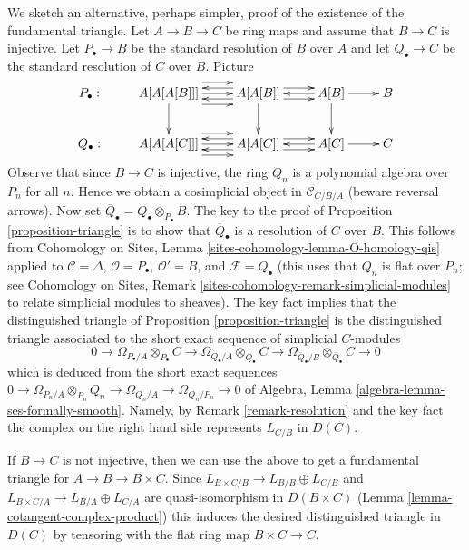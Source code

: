 \begin{remark}
\label{remark-triangle}
We sketch an alternative, perhaps simpler, proof of the existence of
the fundamental triangle.
Let $A \to B \to C$ be ring maps and assume that $B \to C$ is injective.
Let $P_\bullet \to B$ be the standard resolution of $B$ over $A$ and
let $Q_\bullet \to C$ be the standard resolution of $C$ over $B$.
Picture
$$
\xymatrix{
P_\bullet : &
A[A[A[B]]] \ar[d]
\ar@<2ex>[r]
\ar@<0ex>[r]
\ar@<-2ex>[r]
&
A[A[B]] \ar[d]
\ar@<1ex>[r]
\ar@<-1ex>[r]
\ar@<1ex>[l]
\ar@<-1ex>[l]
&
A[B] \ar[d] \ar@<0ex>[l] \ar[r] &
B \\
Q_\bullet : &
A[A[A[C]]]
\ar@<2ex>[r]
\ar@<0ex>[r]
\ar@<-2ex>[r]
&
A[A[C]]
\ar@<1ex>[r]
\ar@<-1ex>[r]
\ar@<1ex>[l]
\ar@<-1ex>[l]
&
A[C] \ar@<0ex>[l] \ar[r] &
C
}
$$
Observe that since $B \to C$ is injective, the ring $Q_n$ is a
polynomial algebra over $P_n$ for all $n$. Hence we obtain a cosimplicial
object in $\mathcal{C}_{C/B/A}$ (beware reversal arrows).
Now set $\overline{Q}_\bullet = Q_\bullet \otimes_{P_\bullet} B$.
The key to the proof of Proposition \ref{proposition-triangle}
is to show that $\overline{Q}_\bullet$ is a resolution of $C$ over $B$.
This follows from Cohomology on Sites, Lemma
\ref{sites-cohomology-lemma-O-homology-qis}
applied to $\mathcal{C} = \Delta$, $\mathcal{O} = P_\bullet$,
$\mathcal{O}' = B$, and $\mathcal{F} = Q_\bullet$ (this uses that $Q_n$
is flat over $P_n$; see Cohomology on Sites, Remark
\ref{sites-cohomology-remark-simplicial-modules} to relate simplicial modules
to sheaves). The key fact implies that the distinguished triangle of
Proposition \ref{proposition-triangle}
is the distinguished triangle associated to the short exact sequence
of simplicial $C$-modules
$$
0 \to
\Omega_{P_\bullet/A} \otimes_{P_\bullet} C \to
\Omega_{Q_\bullet/A} \otimes_{Q_\bullet} C \to
\Omega_{\overline{Q}_\bullet/B} \otimes_{\overline{Q}_\bullet} C \to 0
$$
which is deduced from the short exact sequences
$0 \to \Omega_{P_n/A} \otimes_{P_n} Q_n \to \Omega_{Q_n/A} \to
\Omega_{Q_n/P_n} \to 0$ of
Algebra, Lemma \ref{algebra-lemma-ses-formally-smooth}.
Namely, by Remark \ref{remark-resolution} and the key fact the complex on the
right hand side represents $L_{C/B}$ in $D(C)$.

\medskip\noindent
If $B \to C$ is not injective, then we can use the above to get a
fundamental triangle for $A \to B \to B \times C$. Since
$L_{B \times C/B} \to L_{B/B} \oplus L_{C/B}$ and
$L_{B \times C/A} \to L_{B/A} \oplus L_{C/A}$
are quasi-isomorphism in $D(B \times C)$
(Lemma \ref{lemma-cotangent-complex-product})
this induces the desired distinguished triangle in $D(C)$
by tensoring with the flat ring map $B \times C \to C$.
\end{remark}

